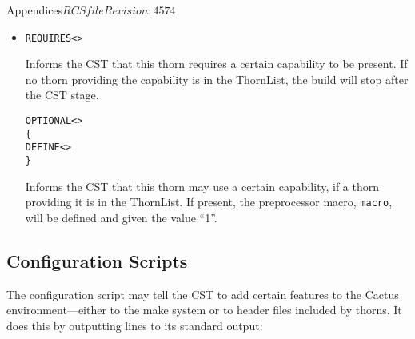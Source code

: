 \begin{cactuspart}{Appendices}{$RCSfile$}{$Revision: 4574 $}
\begin{itemize}
Informs the CST that this thorn provides a given capability, and that
this capability has a given detection script which may be used to
configure it (e.g. running an autoconf script or detecting an external
library's location).  The script should output configuration
information on its standard output---the syntax is described below
in Section \ref{sec:Appendix.configuration.ccl.configscript}.  The
script may also indicate the failure to detect a capability by
returning a non-zero exit code;  this will stop the build after the
CST stage.

Scripts can be in any language.  If an interpreter is needed to run
the script, for example \verb|Perl|, this should be indicated by the
\verb|LANG| option.

The specified options are checked for in the original configuration,
and any options passed on the command line (including an `options'
file) at compile time when the thorn is added, or if the CST is
rerun.  These options need be set only once, and will be remembered
between builds.

\item

\begin{alltt}
REQUIRES  <>
\end{alltt}

Informs the CST that this thorn requires a certain capability to be
present.  If no thorn providing the capability is in the ThornList,
the build will stop after the CST stage.

\begin{alltt}
OPTIONAL <>
\{
  DEFINE <>
\}
\end{alltt}

Informs the CST that this thorn may use a certain capability, if a
thorn providing it is in the ThornList.  If present, the preprocessor
macro, \verb|macro|, will be defined and given the value ``1''.

\end{itemize}

\subsection{Configuration Scripts}
\label{sec:Appendix.configuration.ccl.configscript}

The configuration script may tell the CST to add certain features to
the Cactus environment---either to the make system or to header
files included by thorns.  It does this by outputting lines to its
standard output:


\end{cactuspart}
